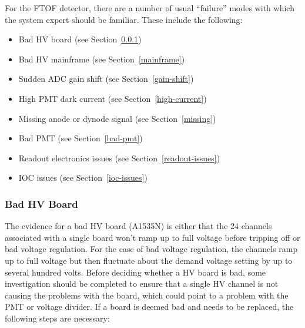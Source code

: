 \documentclass[12pt]{article}
\begin{document}
For the FTOF detector, there are a number of usual ``failure'' modes with which the 
system expert should be familiar. These include the following:

\begin{itemize}
\item Bad HV board (see Section~\ref{board-swap})
\item Bad HV mainframe (see Section~\ref{mainframe})
\item Sudden ADC gain shift (see Section~\ref{gain-shift})
\item High PMT dark current (see Section~\ref{high-current})
\item Missing anode or dynode signal (see Section~\ref{missing})
\item Bad PMT (see Section~\ref{bad-pmt})
\item Readout electronics issues (see Section~\ref{readout-issues})
\item IOC issues (see Section~\ref{ioc-issues})
\end{itemize}

\subsubsection{Bad HV Board}
\label{board-swap}

The evidence for a bad HV board (A1535N) is either that the 24 channels associated 
with a single board won't ramp up to full voltage before tripping off or bad voltage 
regulation. For the case of bad voltage regulation, the channels ramp up to full 
voltage but then fluctuate about the demand voltage setting by up to several hundred 
volts. Before deciding whether a HV board is bad, some investigation should be 
completed to ensure that a single HV channel is not causing the problems with the 
board, which could point to a problem with the PMT or voltage divider. If a board is 
deemed bad and needs to be replaced, the following steps are necessary:
\end{document}
